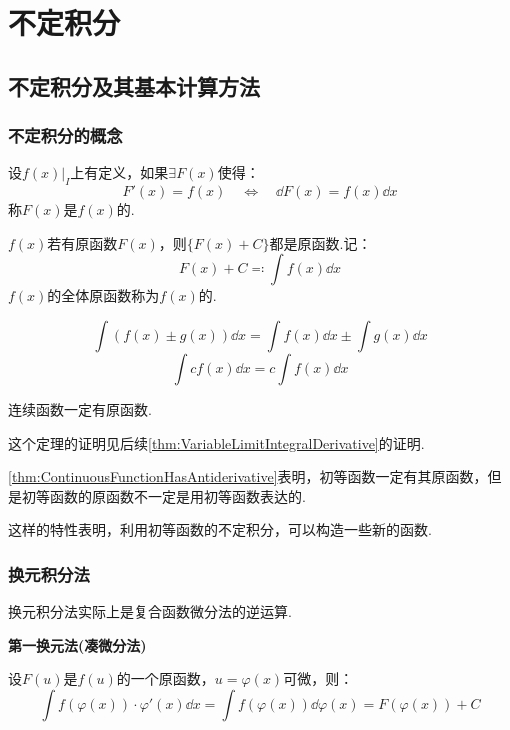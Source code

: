 \chapter{不定积分}
\section{不定积分及其基本计算方法}
\subsection{不定积分的概念}
\begin{definition}
    设$\left.f(x)\right|_{I}$上有定义，如果$\exists F(x)$使得：
    \[F'(x) = f(x) \quad\Leftrightarrow\quad \dd{F(x)} = f(x)\dd{x}\]
    称$F(x)$是$f(x)$的.
\end{definition}

\begin{definition}
    $f(x)$若有原函数$F(x)$，则$\{F(x)+C\}$都是原函数.记：
    \[F(x) + C \eqcolon \int f(x)\dd{x}\]
    $f(x)$的全体原函数称为$f(x)$的.
\end{definition}

\begin{theorem}
    \[\int (f(x)\pm g(x))\dd{x} = \int f(x)\dd{x} \pm \int g(x)\dd{x}\]
    \[\int c f(x)\dd{x} = c \int f(x)\dd{x}\]
\end{theorem}

\begin{theorem}
    \label{thm:ContinuousFunctionHasAntiderivative}
    连续函数一定有原函数.
\end{theorem}

这个定理的证明见后续\cref{thm:VariableLimitIntegralDerivative}的证明.

\cref{thm:ContinuousFunctionHasAntiderivative}表明，初等函数一定有其原函数，但是初等函数的原函数不一定是用初等函数表达的.

这样的特性表明，利用初等函数的不定积分，可以构造一些新的函数.


\subsection{换元积分法}
换元积分法实际上是复合函数微分法的逆运算.
\begin{theorem}
    \textbf{第一换元法(凑微分法)}

    设$F(u)$是$f(u)$的一个原函数，$u = \varphi(x)$可微，则：
    \[\int f(\varphi(x))\cdot\varphi'(x)\dd{x} = \int f(\varphi(x))\dd{\varphi(x)} = F(\varphi(x)) + C\]
\end{theorem}

